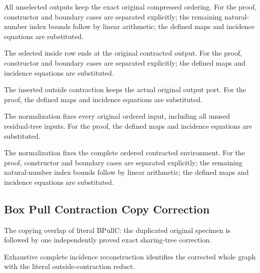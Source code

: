 All unselected outputs keep the exact original compressed ordering.
For the proof, constructor and boundary cases are separated explicitly; the remaining natural-number index bounds follow by linear arithmetic; the defined maps and incidence equations are substituted.
\par{}

The selected inside row ends at the original contracted output.
For the proof, constructor and boundary cases are separated explicitly; the defined maps and incidence equations are substituted.
\par{}

The inserted outside contraction keeps the actual original output port.
For the proof, the defined maps and incidence equations are substituted.
\par{}

The normalization fixes every original ordered input, including all unused residual-tree inputs.
For the proof, the defined maps and incidence equations are substituted.
\par{}

The normalization fixes the complete ordered contracted environment.
For the proof, constructor and boundary cases are separated explicitly; the remaining natural-number index bounds follow by linear arithmetic; the defined maps and incidence equations are substituted.
\par{}

\subsection{Box Pull Contraction Copy Correction}
The copying overlap of literal BPullC: the duplicated original specimen is followed by one independently proved exact sharing-tree correction.

Exhaustive complete incidence reconstruction identifies the corrected whole graph with the literal outside-contraction reduct.
\par{}

